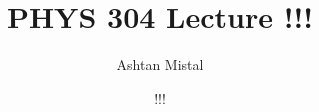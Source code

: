\documentclass{article}
\title{PHYS 304 Lecture !!!}
\author{Ashtan Mistal}
\date{!!!}
\begin{document}
\ifstandalone
\maketitle
\fi

\graphicspath{{./Lecture!!!/}}
\end{document}
